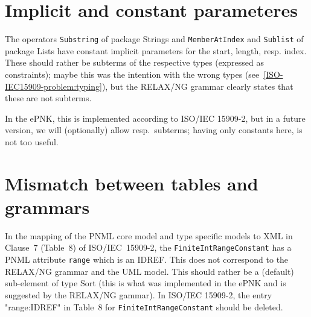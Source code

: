 \section{Implicit and constant parameteres}    
The operators {\tt Substring} of package Strings and {\tt MemberAtIndex} and
{\tt Sublist} of package Lists have constant implicit parameters for
the start, length, resp. index. These should rather be subterms
of the respective types (expressed as constraints); maybe this was the intention
with the wrong types (see~\ref{ISO-IEC15909-problem:typing}), but the
RELAX/NG grammar clearly states that these are not subterms.

In the ePNK, this is implemented according to ISO/IEC 15909-2, but in a
future version, we will (optionally) allow resp.\ subterms; having only
constants here, is not too useful.
    
\section{Mismatch between tables and grammars} 
In the mapping of the PNML core model and type specific models to XML in
Clause~7 (Table~8) of ISO/IEC~15909-2, the {\tt FiniteIntRangeConstant} has a
PNML attribute {\tt range} which is an IDREF.
This does not correspond to the RELAX/NG grammar and the UML model. This
should rather be a (default) sub-element of type Sort (this is what was
implemented in the ePNK and is suggested by the RELAX/NG gammar).
In ISO/IEC 15909-2, the entry "range:IDREF" in Table~8 for
{\tt FiniteIntRangeConstant} should be deleted.
  
